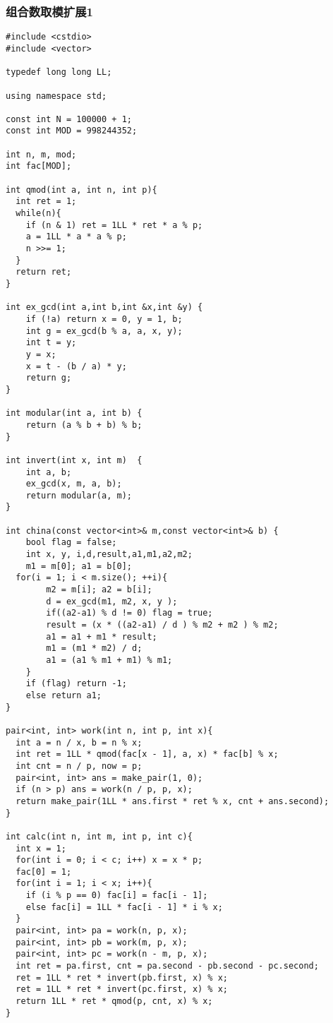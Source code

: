 \subsubsection{组合数取模扩展1}
\begin{verbatim}
#include <cstdio>
#include <vector>

typedef long long LL;

using namespace std;

const int N = 100000 + 1;
const int MOD = 998244352;

int n, m, mod;
int fac[MOD];

int qmod(int a, int n, int p){
  int ret = 1; 
  while(n){
    if (n & 1) ret = 1LL * ret * a % p;
    a = 1LL * a * a % p;
    n >>= 1;
  }
  return ret;
}

int ex_gcd(int a,int b,int &x,int &y) {
    if (!a) return x = 0, y = 1, b;
    int g = ex_gcd(b % a, a, x, y);
    int t = y;
    y = x;
    x = t - (b / a) * y;
    return g;
}

int modular(int a, int b) { 
    return (a % b + b) % b; 
}

int invert(int x, int m)  { 
    int a, b;
    ex_gcd(x, m, a, b);
    return modular(a, m);
}

int china(const vector<int>& m,const vector<int>& b) {
    bool flag = false;
    int x, y, i,d,result,a1,m1,a2,m2;
    m1 = m[0]; a1 = b[0];
  for(i = 1; i < m.size(); ++i){
        m2 = m[i]; a2 = b[i];
        d = ex_gcd(m1, m2, x, y );
        if((a2-a1) % d != 0) flag = true;
        result = (x * ((a2-a1) / d ) % m2 + m2 ) % m2;
        a1 = a1 + m1 * result; 
        m1 = (m1 * m2) / d;   
        a1 = (a1 % m1 + m1) % m1;
    }
    if (flag) return -1;
    else return a1;
}

pair<int, int> work(int n, int p, int x){
  int a = n / x, b = n % x;
  int ret = 1LL * qmod(fac[x - 1], a, x) * fac[b] % x;
  int cnt = n / p, now = p;
  pair<int, int> ans = make_pair(1, 0);
  if (n > p) ans = work(n / p, p, x);
  return make_pair(1LL * ans.first * ret % x, cnt + ans.second);
}

int calc(int n, int m, int p, int c){
  int x = 1;
  for(int i = 0; i < c; i++) x = x * p;
  fac[0] = 1;
  for(int i = 1; i < x; i++){
    if (i % p == 0) fac[i] = fac[i - 1];
    else fac[i] = 1LL * fac[i - 1] * i % x;
  }
  pair<int, int> pa = work(n, p, x);
  pair<int, int> pb = work(m, p, x);
  pair<int, int> pc = work(n - m, p, x);
  int ret = pa.first, cnt = pa.second - pb.second - pc.second;
  ret = 1LL * ret * invert(pb.first, x) % x;
  ret = 1LL * ret * invert(pc.first, x) % x;
  return 1LL * ret * qmod(p, cnt, x) % x;
}


\end{verbatim}
